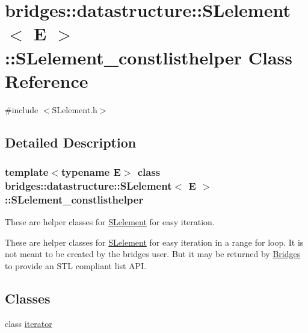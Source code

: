\hypertarget{classbridges_1_1datastructure_1_1_s_lelement_1_1_s_lelement__constlisthelper}{}\section{bridges\+:\+:datastructure\+:\+:S\+Lelement$<$ E $>$\+:\+:S\+Lelement\+\_\+constlisthelper Class Reference}
\label{classbridges_1_1datastructure_1_1_s_lelement_1_1_s_lelement__constlisthelper}


{\ttfamily \#include $<$S\+Lelement.\+h$>$}



\subsection{Detailed Description}
\subsubsection*{template$<$typename E$>$\newline
class bridges\+::datastructure\+::\+S\+Lelement$<$ E $>$\+::\+S\+Lelement\+\_\+constlisthelper}

These are helper classes for \hyperlink{classbridges_1_1datastructure_1_1_s_lelement}{S\+Lelement} for easy iteration. 

These are helper classes for \hyperlink{classbridges_1_1datastructure_1_1_s_lelement}{S\+Lelement} for easy iteration in a range for loop. It is not meant to be created by the bridges user. But it may be returned by \hyperlink{classbridges_1_1_bridges}{Bridges} to provide an S\+TL compliant list A\+PI. \subsection*{Classes}
\begin{DoxyCompactItemize}
\item 
class \hyperlink{classbridges_1_1datastructure_1_1_s_lelement_1_1_s_lelement__constlisthelper_1_1iterator}{iterator}
\end{DoxyCompactItemize}
